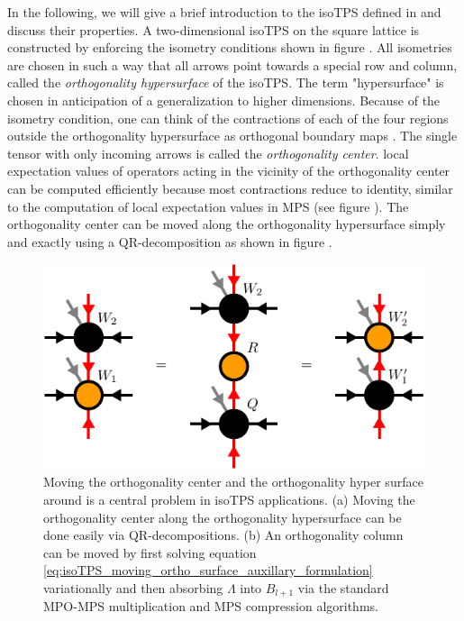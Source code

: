 In the following, we will give a brief introduction to the isoTPS defined in \cite{cite:isometric_tensor_network_states_in_two_dimensions} and discuss their properties. A two-dimensional isoTPS on the square lattice is constructed by enforcing the isometry conditions shown in figure . All isometries are chosen in such a way that all arrows point towards a special row and column, called the \textit{orthogonality hypersurface} of the isoTPS. The term "hypersurface" is chosen in anticipation of a generalization to higher dimensions. Because of the isometry condition, one can think of the contractions of each of the four regions outside the orthogonality hypersurface as orthogonal boundary maps \cite{cite:efficient_simulation_of_dynamics_in_two_dimensional_quantum_spin_systems}. The single tensor with only incoming arrows is called the \textit{orthogonality center}. local expectation values of operators acting in the vicinity of the orthogonality center can be computed efficiently because most contractions reduce to identity, similar to the computation of local expectation values in MPS (see figure ). The orthogonality center can be moved along the orthogonality hypersurface simply and exactly using a QR-decomposition as shown in figure . \par
\begin{figure}
	\centering
	\includegraphics[scale=1]{figures/tikz/Tensor_Networks/isoTPS_moving_ortho_center/isoTPS_moving_ortho_center.pdf}
	\caption{Moving the orthogonality center and the orthogonality hyper surface around is a central problem in isoTPS applications. (a) Moving the orthogonality center along the orthogonality hypersurface can be done easily via QR-decompositions. (b) An orthogonality column can be moved by first solving equation \eqref{eq:isoTPS_moving_ortho_surface_auxillary_formulation} variationally and then absorbing $\Lambda$ into $B_{l+1}$ via the standard MPO-MPS multiplication and MPS compression algorithms.}
	\label{fig:isoTPS_moving_ortho_center}
\end{figure}

